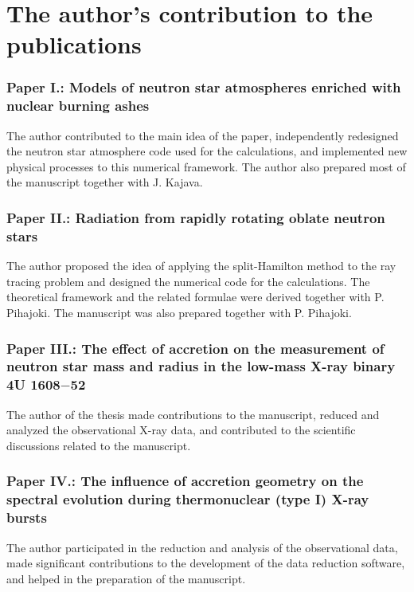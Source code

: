 \section{The author's contribution to the publications} 

\subsubsection*{Paper I.: Models of neutron star atmospheres enriched with nuclear burning ashes}
The author contributed to the main idea of the paper, independently redesigned the neutron star atmosphere code used for the calculations, and implemented new physical processes to this numerical framework. 
The author also prepared most of the manuscript together with J. Kajava.


\subsubsection*{Paper II.: Radiation from rapidly rotating oblate neutron stars}
The author proposed the idea of applying the split-Hamilton method to the ray tracing problem and designed the numerical code for the calculations. 
The theoretical framework and the related formulae were derived together with P. Pihajoki. 
The manuscript was also prepared together with P. Pihajoki.


\subsubsection*{Paper III.: The effect of accretion on the measurement of neutron star mass and radius in the low-mass X-ray binary 4U 1608$-$52}
The author of the thesis made contributions to the manuscript, reduced and analyzed the observational X-ray data, and contributed to the scientific discussions related to the manuscript.


\subsubsection*{Paper IV.: The influence of accretion geometry on the spectral evolution during thermonuclear (type I) X-ray bursts}
The author participated in the reduction and analysis of the observational data, made significant contributions to the development of the data reduction software, and helped in the preparation of the manuscript.


